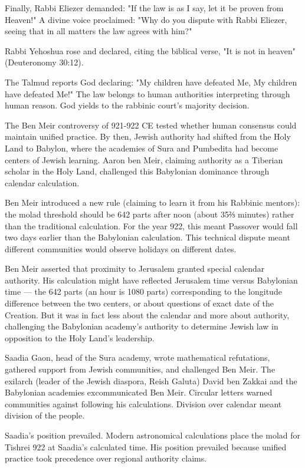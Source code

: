 Finally, Rabbi Eliezer demanded: "If the law is as I say, let it be proven from Heaven!" A divine voice proclaimed: "Why do you dispute with Rabbi Eliezer, seeing that in all matters the law agrees with him?"

Rabbi Yehoshua rose and declared, citing the biblical verse, "It is not in heaven" (Deuteronomy 30:12).

The Talmud reports God declaring: "My children have defeated Me, My children have defeated Me!" The law belongs to human authorities interpreting through human reason. God yields to the rabbinic court's majority decision.

The Ben Meir controversy of 921-922 CE tested whether human consensus could maintain unified practice. By then, Jewish authority had shifted from the Holy Land to Babylon, where the academies of Sura and Pumbedita had become centers of Jewish learning. Aaron ben Meir, claiming authority as a Tiberian scholar in the Holy Land, challenged this Babylonian dominance through calendar calculation.

Ben Meir introduced a new rule (claiming to learn it from his Rabbinic mentors): the molad threshold should be 642 parts after noon (about 35⅔ minutes) rather than the traditional calculation. For the year 922, this meant Passover would fall two days earlier than the Babylonian calculation. This technical dispute meant different communities would observe holidays on different dates.

Ben Meir asserted that proximity to Jerusalem granted special calendar authority. His calculation might have reflected Jerusalem time versus Babylonian time — the 642 parts (an hour is 1080 parts) corresponding to the longitude difference between the two centers, or about questions of exact date of the Creation. But it was in fact less about the calendar and more about authority, challenging the Babylonian academy's authority to determine Jewish law in opposition to the Holy Land's leadership.

Saadia Gaon, head of the Sura academy, wrote mathematical refutations, gathered support from Jewish communities, and challenged Ben Meir. The exilarch (leader of the Jewish diaspora, Reish Galuta) David ben Zakkai and the Babylonian academies excommunicated Ben Meir. Circular letters warned communities against following his calculations. Division over calendar meant division of the people.

Saadia's position prevailed. Modern astronomical calculations place the molad for Tishrei 922 at Saadia's calculated time. His position prevailed because unified practice took precedence over regional authority claims.

